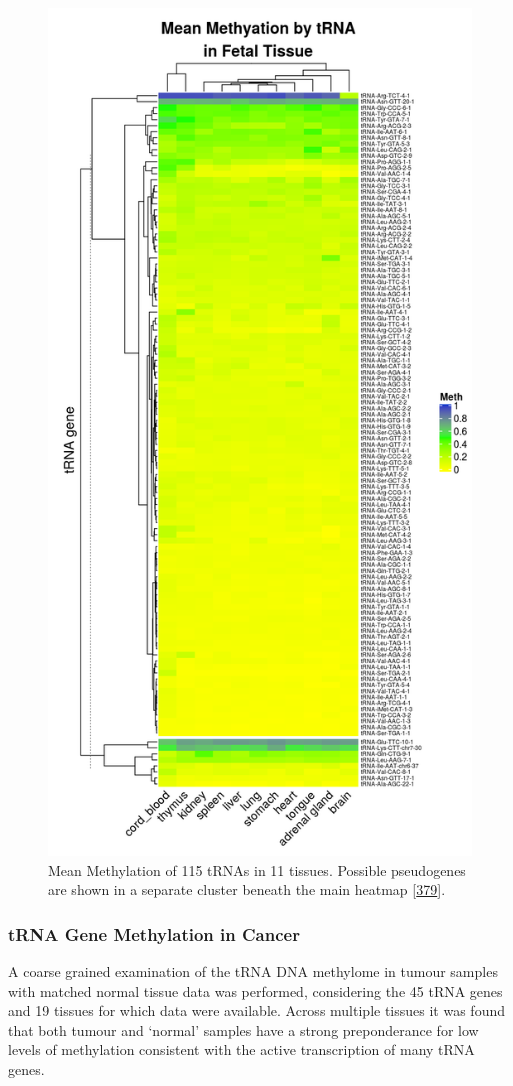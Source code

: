 \documentclass[
]{book}
\begin{document}
\begin{figure}

{\centering \includegraphics[width=0.6\linewidth]{./figs/meanMethBytRNAByFetalTissueHeatmapPseudosplit} 

}

\caption{Mean Methylation of 115 tRNAs in 11 tissues. Possible pseudogenes are shown in a separate cluster beneath the main heatmap {[}\protect\hyperlink{ref-Gu2016}{379}{]}.}\label{fig:meanMethBytRNAByFetalTissueHeatmap}
\end{figure}



\hypertarget{trna-gene-methylation-in-cancer}{%
\subsubsection{tRNA Gene Methylation in Cancer}\label{trna-gene-methylation-in-cancer}}

A coarse grained examination of the tRNA DNA methylome in tumour samples with matched normal tissue data was performed, considering the 45 tRNA genes and 19 tissues for which data were available.
Across multiple tissues it was found that both tumour and `normal' samples have a strong preponderance for low levels of methylation consistent with the active transcription of many tRNA genes.
\end{document}
